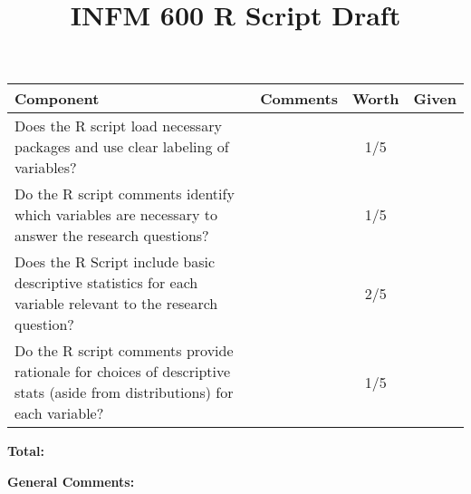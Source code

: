 \documentclass[12pt]{article}
\title{INFM 600 R Script Draft}
\date{\vspace{-10ex}}%
\newcommand\tab[1][0.25cm]{\hspace*{#1}}
\begin{document}
	\maketitle
		\renewcommand{\arraystretch}{2}
		\begin{tabulary}{6.5in}{| p{2.75in} | p{2.5in} | c | c |}
			\hline
			\textbf{Component} & \textbf{Comments} & \textbf{Worth} & \textbf{Given}\\
			\hline
			Does the R script load necessary packages and use clear labeling of variables?  & &  1/5 & \\
			\hline
			Do the R script comments identify which variables are necessary to answer the research questions? & & 1/5 &\\
			\hline
			Does the R Script include basic descriptive statistics for each variable relevant to the research question? & &  2/5 & \\
			\hline
			Do the R script comments provide rationale for choices of descriptive stats (aside from distributions) for each variable? & &  1/5 & \\
			\hline
		\end{tabulary}

\begin{flushright}
	\textbf{Total:}\tab[3.3cm]
\end{flushright}


	\textbf{General Comments:}

	
\end{document}
